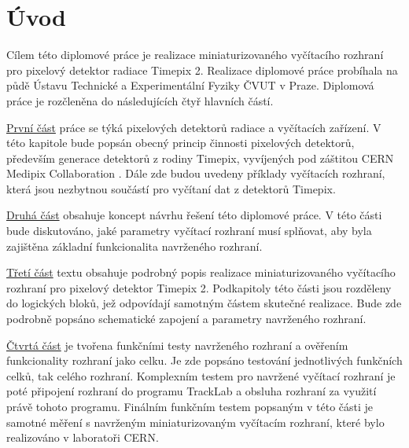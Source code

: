 \chapter{Úvod}



Cílem této diplomové práce je realizace miniaturizovaného vyčítacího rozhraní pro pixelový detektor radiace Timepix 2. Realizace diplomové práce probíhala na půdě Ústavu Technické a Experimentální Fyziky ČVUT v Praze. Diplomová práce je rozčleněna do následujících čtyř hlavních částí.

\par \hyperref[kap:2]{První část} práce se týká pixelových detektorů radiace a vyčítacích zařízení. V této kapitole bude popsán obecný princip činnosti pixelových detektorů, především generace detektorů z rodiny Timepix, vyvíjených pod záštitou CERN Medipix Collaboration \cite{Medpix}. Dále zde budou uvedeny příklady vyčítacích rozhraní, která jsou nezbytnou součástí pro vyčítaní dat z detektorů Timepix.

\par \hyperref[Koncept reseni]{Druhá část} obsahuje koncept návrhu řešení této diplomové práce. V této části bude diskutováno, jaké parametry vyčítací rozhraní musí splňovat, aby byla zajištěna základní funkcionalita navrženého rozhraní.

\par \hyperref[realizace]{Třetí část} textu obsahuje podrobný popis realizace miniaturizovaného vyčítacího rozhraní pro pixelový detektor Timepix 2. Podkapitoly této části jsou rozděleny do logických bloků, jež odpovídají samotným částem skutečné realizace. Bude zde podrobně popsáno schematické zapojení a parametry navrženého rozhraní.

\par \hyperref[testovani]{Čtvrtá část} je tvořena funkčními testy navrženého rozhraní a ověřením funkcionality rozhraní jako celku. Je zde popsáno testování jednotlivých funkčních celků, tak celého rozhraní. Komplexním testem pro navržené vyčítací rozhraní je poté připojení rozhraní do programu TrackLab \cite{Manek_2024} a obsluha rozhraní za využití právě tohoto programu. Finálním funkčním testem popsaným v této části je samotné měření s navrženým miniaturizovaným vyčítacím rozhraní, které bylo realizováno v laboratoři CERN.